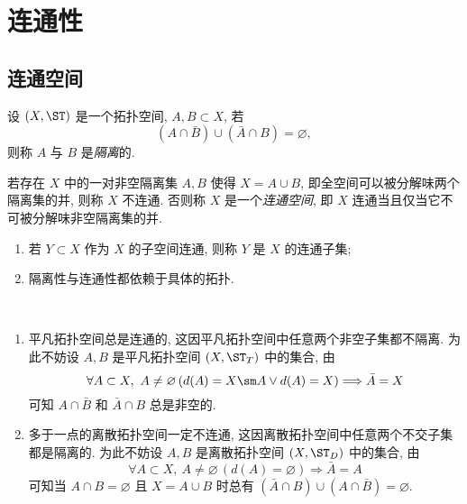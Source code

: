 
\section{连通性}

\subsection{连通空间}

    \begin{Definition}[隔离集]
        设 $ (X,\ST) $ 是一个拓扑空间, $ A, B\subset X $, 若
        \[
            (A\cap\bar{B})\cup(\bar{A}\cap B)=\varnothing,
        \]
        则称 $ A $ 与 $ B $ 是\emph{隔离}的.
    \end{Definition}

    \begin{Definition}[连通空间]
        若存在 $ X $ 中的一对非空隔离集 $ A, B $ 使得 $ X=A\cup B $, 即全空间可以被分解味两个隔离集的并, 则称 $ X $ 不连通. 否则称 $ X $ 是一个\emph{连通空间}, 即 $ X $ 连通当且仅当它不可被分解味非空隔离集的并.
        \begin{enumerate}
            \item 若 $ Y\subset X $ 作为 $ X $ 的子空间连通, 则称 $ Y $ 是 $ X $ 的连通子集;
            \item 隔离性与连通性都依赖于具体的拓扑.
        \end{enumerate}
    \end{Definition}

    \begin{Example}~
        \begin{enumerate}
            \item 平凡拓扑空间总是连通的, 这因平凡拓扑空间中任意两个非空子集都不隔离. 为此不妨设 $ A, B $ 是平凡拓扑空间 $ (X,\ST_T) $ 中的集合, 由
            \[
                \forall A\subset X,\ A\ne\varnothing\,(d(A)=X\sm A\lor d(A)=X)\Longrightarrow \bar{A}=X
            \]
            可知 $ A\cap\bar{B} $ 和 $ \bar{A}\cap B $ 总是非空的.
            \item 多于一点的离散拓扑空间一定不连通, 这因离散拓扑空间中任意两个不交子集都是隔离的. 为此不妨设 $ A, B $ 是离散拓扑空间 $ (X,\ST_D) $ 中的集合, 由
            \[
                \forall A\subset X,\ A\ne\varnothing\,(d(A)=\varnothing)\Longrightarrow \bar{A}=A
            \]
            可知当 $ A\cap B=\varnothing $ 且 $ X=A\cup B $ 时总有 $ (\bar{A}\cap B)\cup(A\cap\bar{B})=\varnothing $.
        \end{enumerate}
    \end{Example}

